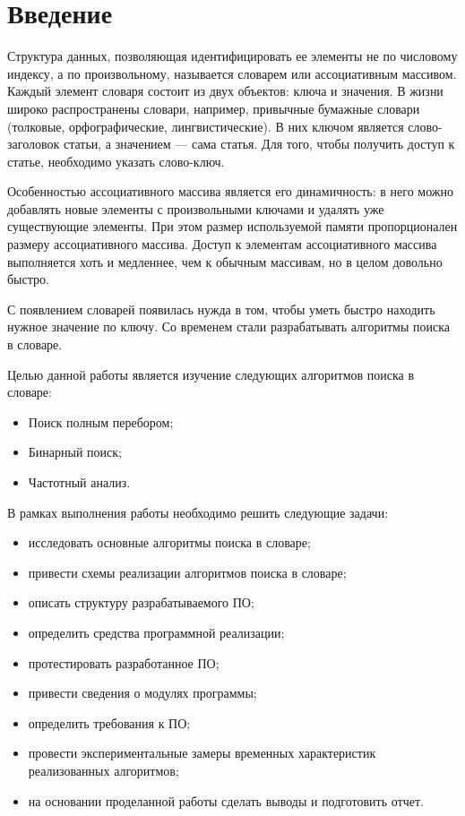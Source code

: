 \chapter*{Введение}

Структура данных, позволяющая идентифицировать ее элементы не по числовому индексу, а по произвольному, называется словарем или ассоциативным массивом. Каждый элемент словаря состоит из двух объектов: ключа и значения. 
В жизни широко распространены словари, например, привычные бумажные словари (толковые, орфографические, лингвистические). В них ключом является слово-заголовок статьи, а значением — сама статья. Для того, чтобы получить доступ к статье, необходимо указать слово-ключ.

Особенностью ассоциативного массива является его динамичность: в него можно добавлять новые элементы с произвольными ключами и удалять уже существующие элементы. При этом размер используемой памяти пропорционален размеру ассоциативного массива. Доступ к элементам ассоциативного массива выполняется хоть и медленнее, чем к обычным массивам, но в целом довольно быстро.

С появлением словарей появилась нужда в том, чтобы уметь быстро
находить нужное значение по ключу. Со временем стали разрабатывать
алгоритмы поиска в словаре.

Целью данной работы является изучение следующих алгоритмов поиска в словаре: 
\begin{itemize}
	\item Поиск полным перебором;
	\item Бинарный поиск;
	\item Частотный анализ.
\end{itemize}

В рамках выполнения работы необходимо решить следующие задачи:
\begin{itemize}
	\item исследовать основные алгоритмы поиска в словаре;
	\item привести схемы реализации алгоритмов поиска в словаре;
	\item описать структуру разрабатываемого ПО;
	\item определить средства программной реализации;
	\item протестировать разработанное ПО;
	\item привести сведения о модулях программы;
	\item определить требования к ПО;
	\item провести экспериментальные замеры временных характеристик реализованных алгоритмов;
	\item на основании проделанной работы сделать выводы и подготовить отчет.
\end{itemize}